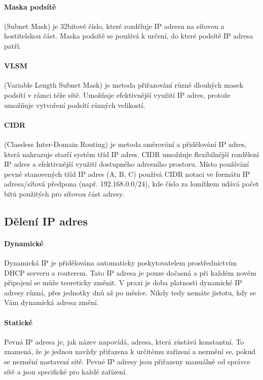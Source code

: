 \paragraph{Maska podsítě} (Subnet Mask) je 32bitové číslo, které rozděluje IP adresu na síťovou a hostitelskou část. Maska podsítě se používá k určení, do které podsítě IP adresa patří.

\paragraph{VLSM} (Variable Length Subnet Mask) je metoda přiřazování různě dlouhých masek podsítí v rámci téže sítě. Umožňuje efektivnější využití IP adres, protože umožňuje vytvoření podsítí různých velikostí.

\paragraph{CIDR} (Classless Inter-Domain Routing) je metoda směrování a přidělování IP adres, která nahrazuje starší systém tříd IP adres. CIDR umožňuje flexibilnější rozdělení IP adres a efektivnější využití dostupného adresního prostoru. Místo používání pevně stanovených tříd IP adres (A, B, C) používá CIDR notaci ve formátu IP adresa/síťová předpona (např. 192.168.0.0/24), kde číslo za lomítkem udává počet bitů použitých pro síťovou část adresy.

\subsection{Dělení IP adres}
\paragraph{Dynamické}
Dynamická IP je přidělována automaticky poskytovatelem prostřednictvím DHCP serveru a routerem. Tato IP adresa je pouze dočasná a při každém novém připojení se může teoreticky změnit. V praxi je doba platnosti dynamické IP adresy různá, přes jednotky dnů až po měsíce. Nikdy tedy nemáte jistotu, kdy se Vám dynamická adresa změní.
\paragraph{Statické}
Pevná IP adresa je, jak název napovídá, adresa, která zůstává konstantní. To znamená, že je jednou navždy přiřazena k určitému zařízení a nezmění se, pokud se nezmění nastavení sítě. Pevné IP adresy jsou přiřazeny manuálně od správce sítě a jsou specifické pro každé zařízení.
